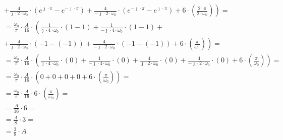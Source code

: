 \begin{task}
\begin{align*}
&\left. +\frac{4}{\jmath \cdot 2 \cdot \omega_0}\cdot \left( e^{\jmath \cdot \pi} - e^{-\jmath \cdot \pi}\right) +\frac{4}{-\jmath \cdot 2 \cdot \omega_0} \cdot \left( e^{-\jmath \cdot \pi} - e^{\jmath \cdot \pi}\right) + 6 \cdot  \left( \frac{2 \cdot \pi}{2\cdot\omega_0} \right)\right)=\\
&=\frac{\omega_0}{\pi} \cdot \frac{A}{16} \cdot \left(\frac{1}{\jmath \cdot 4 \cdot \omega_0} \cdot \left( 1 - 1\right) +\frac{1}{-\jmath \cdot 4 \cdot \omega_0}\cdot \left( 1 - 1\right)\right.+\\
&\left. +\frac{4}{\jmath \cdot 2 \cdot \omega_0}\cdot \left( -1 - (-1)\right) +\frac{4}{-\jmath \cdot 2 \cdot \omega_0} \cdot \left(-1 - (-1)\right) + 6 \cdot  \left( \frac{\pi}{\omega_0} \right)\right)=\\
&=\frac{\omega_0}{\pi} \cdot \frac{A}{16} \cdot \left(\frac{1}{\jmath \cdot 4 \cdot \omega_0} \cdot \left( 0\right) +\frac{1}{-\jmath \cdot 4 \cdot \omega_0}\cdot \left( 0\right) +\frac{4}{\jmath \cdot 2 \cdot \omega_0}\cdot \left( 0\right) +\frac{4}{-\jmath \cdot 2 \cdot \omega_0} \cdot \left(0\right) + 6 \cdot  \left( \frac{\pi}{\omega_0} \right)\right)=\\
&=\frac{\omega_0}{\pi} \cdot \frac{A}{16} \cdot \left(0 +0 +0 +0 + 6 \cdot  \left( \frac{\pi}{\omega_0} \right)\right)=\\
&=\frac{\omega_0}{\pi} \cdot \frac{A}{16} \cdot 6 \cdot  \left( \frac{\pi}{\omega_0} \right)=\\
&= \frac{A}{16} \cdot 6=\\
&= \frac{A}{8} \cdot 3=\\
&= \frac{3}{8} \cdot A\\
\end{align*}

\end{task}
